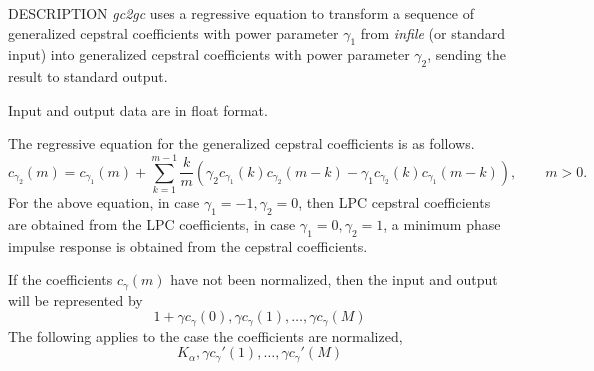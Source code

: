 \begin{synopsis}
\item [gc2gc] [ --m $M_1$ ] [ --g $G_1$ ] [ --c $C_1$ ] [ --n ] [ --u ] 
\item [\ ~~~~~~]  [ --M $M_2$ ] [ --G $G_2$ ] [ --C $C_2$ ] [ --N ] [ --U ] [ {\em infile} ]
\end{synopsis}

\begin{qsection}{DESCRIPTION}
{\em gc2gc} uses a regressive equation 
to transform a sequence of generalized cepstral coefficients 
with power parameter $\gamma_1$ from {\em infile} (or standard input)
into generalized cepstral coefficients with power parameter $\gamma_2$, 
sending the result to standard output.

Input and output data are in float format.

The regressive equation for the generalized cepstral coefficients 
is as follows.
\begin{displaymath}
  c_{\gamma_2}(m) = c_{\gamma_1}(m) + \sum_{k=1}^{m-1}\frac{k}{m}
                      (\gamma_2 c_{\gamma_1}(k)c_{\gamma_2}(m-k)
                  -\gamma_1 c_{\gamma_2}(k)
                        c_{\gamma_1}(m-k)), \qquad m>0.
\end{displaymath}
For the above equation, in case $\gamma_1=-1, \gamma_2=0$,
then LPC cepstral coefficients are obtained from the LPC coefficients,
in case $\gamma_1=0, \gamma_2=1$, a minimum phase impulse response is
obtained from the cepstral coefficients.

If the coefficients $c_\gamma(m)$ have not been normalized,
then the input and output will be represented by
\begin{displaymath}
1+\gamma c_\gamma(0), \gamma c_\gamma(1), \dots, \gamma c_\gamma(M)
\end{displaymath}
The following applies to the case the coefficients are normalized,
\begin{displaymath}
K_\alpha,\gamma c_\gamma'(1),\dots, \gamma c_\gamma'(M)
\end{displaymath}

\end{qsection}

